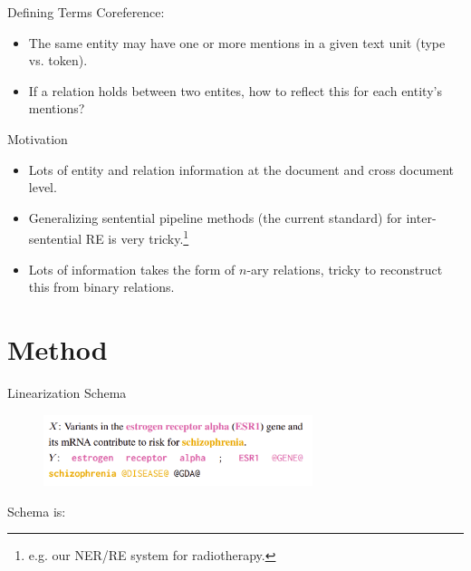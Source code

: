 \documentclass[usenames,dvipsnames,pdf]{beamer}
\begin{document}
        \begin{frame}{Defining Terms}
          Coreference:
          \begin{itemize}
          \item
            The same entity may have one or more mentions in a given text unit (type vs. token).
          \item
            If a relation holds between two entites, how to reflect this for each entity's mentions?
          \end{itemize}
        \end{frame}
        
        \begin{frame}{Motivation}
          \begin{itemize}
          \item
            Lots of entity and relation information at the document and cross document level.
          \item
            Generalizing sentential pipeline methods (the current standard) for inter-sentential RE is very tricky.\footnote{e.g. our NER/RE system for radiotherapy.}
          \item
            Lots of information takes the form of $n$-ary relations, tricky to reconstruct this from binary relations.
          \end{itemize}
        \end{frame}
        
        \section{Method}

        \begin{frame}{Linearization Schema}
          \begin{figure}
          \includegraphics[width=0.7\textwidth,height=0.7\textheight,keepaspectratio]{linearization} 
          \end{figure}
          Schema is:

          
          \begin{adjustbox}{varwidth=\linewidth}%
            \small{}


            \small{}


            \small{}
            \end{adjustbox}
        \end{frame}
\end{document}
